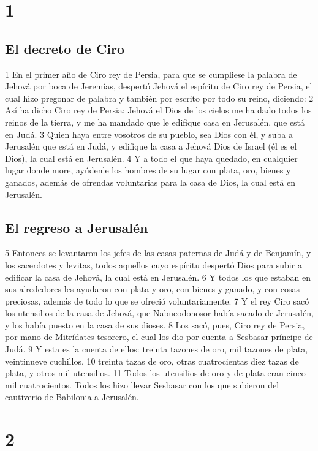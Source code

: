 
\chapter{1}

\section*{El decreto de Ciro}

 
1 En el primer año de Ciro rey de Persia, para que se cumpliese la palabra de Jehová por boca de Jeremías, despertó Jehová el espíritu de Ciro rey de Persia, el cual hizo pregonar de palabra y también por escrito por todo su reino, diciendo:
2 Así ha dicho Ciro rey de Persia: Jehová el Dios de los cielos me ha dado todos los reinos de la tierra, y me ha mandado que le edifique casa en Jerusalén, que está en Judá.
3 Quien haya entre vosotros de su pueblo, sea Dios con él, y suba a Jerusalén que está en Judá, y edifique la casa a Jehová Dios de Israel (él es el Dios), la cual está en Jerusalén.
4 Y a todo el que haya quedado, en cualquier lugar donde more, ayúdenle los hombres de su lugar con plata, oro, bienes y ganados, además de ofrendas voluntarias para la casa de Dios, la cual está en Jerusalén.
\section*{El regreso a Jerusalén}

5 Entonces se levantaron los jefes de las casas paternas de Judá y de Benjamín, y los sacerdotes y levitas, todos aquellos cuyo espíritu despertó Dios para subir a edificar la casa de Jehová, la cual está en Jerusalén.
6 Y todos los que estaban en sus alrededores les ayudaron con plata y oro, con bienes y ganado, y con cosas preciosas, además de todo lo que se ofreció voluntariamente.
7 Y el rey Ciro sacó los utensilios de la casa de Jehová, que Nabucodonosor había sacado de Jerusalén, y los había puesto en la casa de sus dioses.
8 Los sacó, pues, Ciro rey de Persia, por mano de Mitrídates tesorero, el cual los dio por cuenta a Sesbasar príncipe de Judá.
9 Y esta es la cuenta de ellos: treinta tazones de oro, mil tazones de plata, veintinueve cuchillos,
10 treinta tazas de oro, otras cuatrocientas diez tazas de plata, y otros mil utensilios.
11 Todos los utensilios de oro y de plata eran cinco mil cuatrocientos. Todos los hizo llevar Sesbasar con los que subieron del cautiverio de Babilonia a Jerusalén.

\chapter{2}

